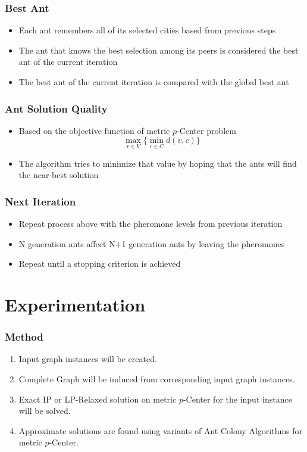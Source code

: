 \documentclass[12pt]{beamer}
\begin{document}
\begin{frame}
\frametitle{Best Ant}
\begin{itemize}
\item Each ant remembers all of its selected cities based from previous steps
\item The ant that knows the best selection among its peers is considered the \alert{best ant} of the \alert{current iteration}
\item The best ant of the current iteration is compared with the \alert{global best ant}
\end{itemize}
\end{frame}

\begin{frame}
\frametitle{Ant Solution Quality}
\begin{itemize}
\item Based on the objective function of metric $p$-Center problem
$$\max_{v \in V}\{ \min_{c \in C} d(v,c)\}$$
\item The algorithm tries to \alert{minimize} that value by hoping that the ants will find the near-best solution
\end{itemize}
\end{frame}


\begin{frame}
\frametitle{Next Iteration}
\begin{itemize}
\item Repeat process above with the \alert{pheromone levels} from previous iteration
\item N generation ants affect N+1 generation ants by leaving the pheromones
\item Repeat until a stopping criterion is achieved
\end{itemize}
\end{frame}

\section{Experimentation}
\begin{frame}
\frametitle{Method}
\begin{center}
\begin{enumerate}
\item Input graph instances will be created.
\item Complete Graph will be induced from corresponding input graph instances.
\item Exact IP or LP-Relaxed solution on metric $p$-Center for the input instance will be solved.
\item Approximate solutions are found using variants of Ant Colony Algorithms for metric $p$-Center.
\end{enumerate}
\end{center}
\end{frame}
\end{document}
